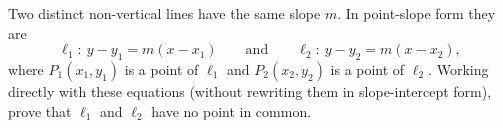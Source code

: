 Two distinct non-vertical lines have the same slope $m$. In point-slope form they are
\[
\ell_1:\ y-y_1=m(x-x_1)\qquad\text{and}\qquad \ell_2:\ y-y_2=m(x-x_2),
\]
where $P_1(x_1,y_1)$ is a point of $\ell_1$ and $P_2(x_2,y_2)$ is a point of $\ell_2$. Working directly with these equations (without rewriting them in slope-intercept form), prove that $\ell_1$ and $\ell_2$ have no point in common.
